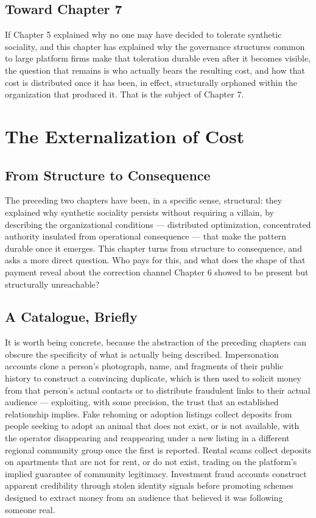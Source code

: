 \documentclass[12pt,a4paper]{book}
\begin{document}
\section{Toward Chapter 7}

If Chapter 5 explained why no one may have decided to tolerate synthetic sociality, and this chapter has explained why the governance structures common to large platform firms make that toleration durable even after it becomes visible, the question that remains is who actually bears the resulting cost, and how that cost is distributed once it has been, in effect, structurally orphaned within the organization that produced it. That is the subject of Chapter 7.


\chapter{The Externalization of Cost}

\section{From Structure to Consequence}

The preceding two chapters have been, in a specific sense, structural: they explained why synthetic sociality persists without requiring a villain, by describing the organizational conditions — distributed optimization, concentrated authority insulated from operational consequence — that make the pattern durable once it emerges. This chapter turns from structure to consequence, and asks a more direct question. Who pays for this, and what does the shape of that payment reveal about the correction channel Chapter 6 showed to be present but structurally unreachable?

\section{A Catalogue, Briefly}

It is worth being concrete, because the abstraction of the preceding chapters can obscure the specificity of what is actually being described. Impersonation accounts clone a person's photograph, name, and fragments of their public history to construct a convincing duplicate, which is then used to solicit money from that person's actual contacts or to distribute fraudulent links to their actual audience — exploiting, with some precision, the trust that an established relationship implies. Fake rehoming or adoption listings collect deposits from people seeking to adopt an animal that does not exist, or is not available, with the operator disappearing and reappearing under a new listing in a different regional community group once the first is reported. Rental scams collect deposits on apartments that are not for rent, or do not exist, trading on the platform's implied guarantee of community legitimacy. Investment fraud accounts construct apparent credibility through stolen identity signals before promoting schemes designed to extract money from an audience that believed it was following someone real.
\end{document}
